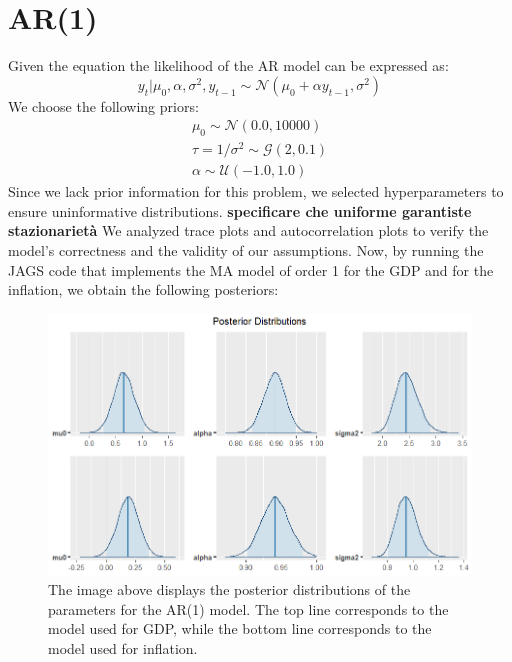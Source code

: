 \section*{AR(1)}
Given the equation  the likelihood of the AR model can be expressed as:
\begin{equation}
    y_{t}|\mu_{0},\alpha,\sigma^2,y_{t-1}\sim \mathcal{N}(\mu_{0} + \alpha y_{t-1}, \sigma^2)
\end{equation}
We choose the following priors:
\begin{equation}
    \begin{split}
        \mu_0 \sim \mathcal{N}(0.0, 10000) \\
        \tau = 1 / \sigma^2 \sim \mathcal{G}(2, 0.1) \\
        \alpha \sim \mathcal{U}(-1.0, 1.0)
    \end{split}
\end{equation}
Since we lack prior information for this problem, we selected hyperparameters to ensure uninformative distributions. \textbf{specificare che uniforme garantiste stazionarietà} We analyzed trace plots and autocorrelation plots to verify the model's correctness and the validity of our assumptions.
Now, by running the JAGS code that implements the MA model of order 1 for the GDP and for the inflation, we obtain the following posteriors: \\
\begin{figure}[h]
    \centering
    \includegraphics[width=\textwidth]{../Images/2-AR/posteriors.png}
    \caption{The image above displays the posterior distributions of the parameters for the AR(1) model. The top line corresponds to the model used for GDP, while the bottom line corresponds to the model used for inflation.}
    \label{fig:AR_posteriors}
\end{figure} \\
